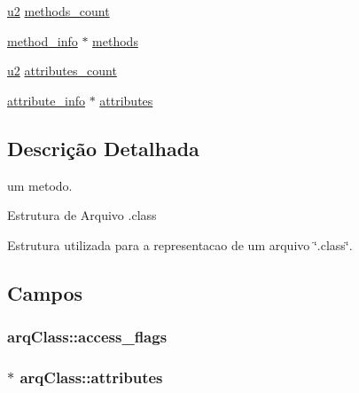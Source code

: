 \begin{DoxyCompactItemize}
\hyperlink{_e___j_v_m_8h_a5f223212eef04d10a4550ded680cb1cf}{u2} \hyperlink{structarq_class_a0cdd803ff7b2a6a229c048bb51f1febc}{methods\+\_\+count}
\item 
\hyperlink{_e___j_v_m_8h_a02c1a928a94e9fab2c72044003c7bce6}{method\+\_\+info} $\ast$ \hyperlink{structarq_class_a849a70430b6245a2cc8b43a2516c5f00}{methods}
\item 
\hyperlink{_e___j_v_m_8h_a5f223212eef04d10a4550ded680cb1cf}{u2} \hyperlink{structarq_class_a4510e8903370aa3575adaa708e4bfed8}{attributes\+\_\+count}
\item 
\hyperlink{_e___j_v_m_8h_a4c2796d61bb99bf730b1807fc838c847}{attribute\+\_\+info} $\ast$ \hyperlink{structarq_class_a401819a5062a82788e07df8ebeb4f78c}{attributes}
\end{DoxyCompactItemize}


\subsection{Descrição Detalhada}
um metodo. 

Estrutura de Arquivo .class

Estrutura utilizada para a representacao de um arquivo \char`\"{}.\+class\char`\"{}. 

\subsection{Campos}
\hypertarget{structarq_class_a2d74614ed3f671871c0385e5233a8250}{}
\subsubsection[{access\+\_\+flags}]{ arq\+Class\+::access\+\_\+flags}\label{structarq_class_a2d74614ed3f671871c0385e5233a8250}
\hypertarget{structarq_class_a401819a5062a82788e07df8ebeb4f78c}{}
\subsubsection[{attributes}]{$\ast$ arq\+Class\+::attributes}\label{structarq_class_a401819a5062a82788e07df8ebeb4f78c}
\hypertarget{structarq_class_a4510e8903370aa3575adaa708e4bfed8}{}
